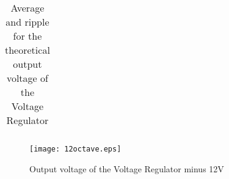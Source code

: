 \begin{table}[H]
  \centering
  \begin{tabular}{|c|c|}
    \hline
        
        \hline
  \end{tabular}
  \caption{Average and ripple for the theoretical output voltage of the Voltage Regulator}
  \label{tab:acdcoc}
\end{table}

\begin{figure}[H]
  \centering
  \texttt{[image: 12octave.eps]}
  \caption{Output voltage of the Voltage Regulator minus 12V}
  \label{fig:vo-12}
\end{figure}
